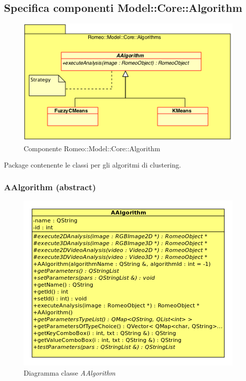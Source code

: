 \subsection{Specifica componenti Model::Core::Algorithm}
\label{specificaModelCoreAlgorithm}

\begin{figure}[!h]
\centering
			\includegraphics[scale=1]{../Specifica_Tecnica/Content/Immagini/Romeo__Model__Core__Adapters__Algorithms.png}
			\caption{Componente Romeo::Model::Core::Algorithm}
			\label{romeo_model_core}
\end{figure}

Package\g{} contenente le classi per gli algoritmi di clustering\g{}.
\subsubsection{AAlgorithm (abstract)}
\label{aalgorithm}
\begin{figure}[!h]
\centering
			\includegraphics[scale=1]{./Content/Immagini/modelCore/AAlgorithm.png}
			\caption{Diagramma classe \textsl{AAlgorithm}}
			\label{aalgorithm_img}
\end{figure}

